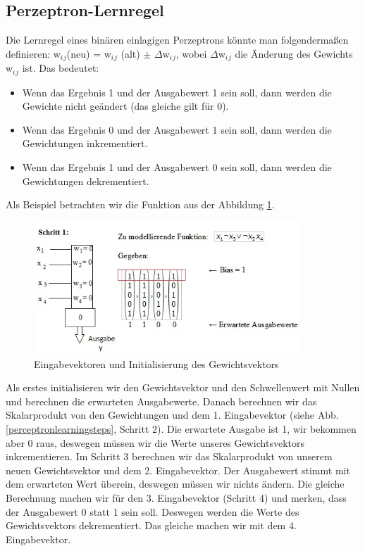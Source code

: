 \subsection{Perzeptron-Lernregel}

Die Lernregel eines binären einlagigen Perzeptrons könnte man folgendermaßen definieren:
\newline
w$_i$$_j$(neu) = w$_i$$_j$ (alt) $\pm$ $\Delta$w$_i$$_j$,
\newline wobei $\Delta$w$_i$$_j$ die Änderung des Gewichts w$_i$$_j$ ist. Das bedeutet:
\begin{itemize}
\item Wenn das Ergebnis 1 und der Ausgabewert 1 sein soll, dann werden die Gewichte nicht geändert (das gleiche gilt für 0).
\item Wenn das Ergebnis 0 und der Ausgabewert 1 sein soll, dann werden die Gewichtungen inkrementiert.
\item Wenn das Ergebnis 1 und der Ausgabewert 0 sein soll, dann werden die Gewichtungen dekrementiert.
\end{itemize}

Als Beispiel betrachten wir die Funktion aus der Abbildung \ref{perceptronlearning}.

\begin{figure}[h]
\centering
\includegraphics[width=10cm]{chapters/neural_networks/schritt1.jpg}

\caption{Eingabevektoren und Initialisierung des Gewichtsvektors}
\label{perceptronlearning}

\end{figure}

Als erstes initialisieren wir den Gewichtsvektor und den Schwellenwert mit Nullen und berechnen die erwarteten Ausgabewerte. Danach berechnen wir das Skalarprodukt von den Gewichtungen und dem 1. Eingabevektor (siehe Abb. \ref{perceptronlearningsteps}, Schritt 2). Die erwartete Ausgabe ist 1, wir bekommen aber 0 raus, deswegen müssen wir die Werte unseres Gewichtsvektors inkrementieren. Im Schritt 3 berechnen wir das Skalarprodukt von unserem neuen Gewichtsvektor und dem 2. Eingabevektor. Der Ausgabewert stimmt mit dem erwarteten Wert überein, deswegen müssen wir nichts ändern. Die gleiche Berechnung machen wir für den 3. Eingabevektor (Schritt 4) und merken, dass der Ausgabewert 0 statt 1 sein soll. Deswegen werden  die Werte des Gewichtsvektors dekrementiert. Das gleiche machen wir mit dem 4. Eingabevektor.

